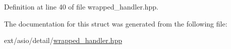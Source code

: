 Definition at line 40 of file wrapped\+\_\+handler.\+hpp.



The documentation for this struct was generated from the following file\+:\begin{DoxyCompactItemize}
\item 
ext/asio/detail/\hyperlink{wrapped__handler_8hpp}{wrapped\+\_\+handler.\+hpp}\end{DoxyCompactItemize}
